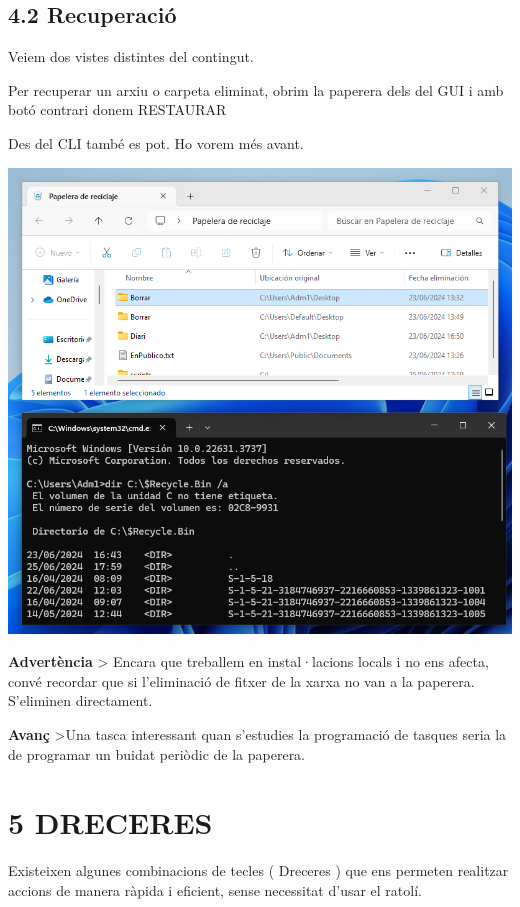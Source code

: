 \documentclass[
  a4paper,
]{article}
\begin{document}
\subsection{4.2 Recuperació}\label{recuperaciuxf3}

Veiem dos vistes distintes del contingut.

Per recuperar un arxiu o carpeta eliminat, obrim la paperera dels del
GUI i amb botó contrari donem RESTAURAR

Des del CLI també es pot. Ho vorem més avant.

\includegraphics{png/paperera1.png}

\textbf{Advertència} \textgreater{} Encara que treballem en
instal·lacions locals i no ens afecta, convé recordar que si
l'eliminació de fitxer de la xarxa no van a la paperera. S'eliminen
directament.

\textbf{Avanç} \textgreater Una tasca interessant quan s'estudies la
programació de tasques seria la de programar un buidat periòdic de la
paperera.

\section{5 DRECERES}\label{dreceres}

Existeixen algunes combinacions de tecles ( Dreceres ) que ens permeten
realitzar accions de manera ràpida i eficient, sense necessitat d'usar
el ratolí.
\end{document}
